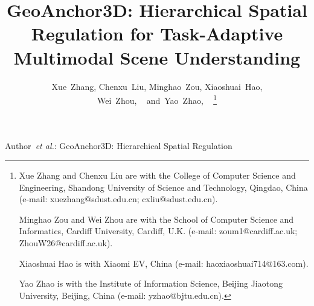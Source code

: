 \documentclass[lettersize,journal]{IEEEtran}
\begin{document}
\setlength{\floatsep}{3pt plus 1pt minus 1pt}
\setlength{\textfloatsep}{3pt plus 1pt minus 1pt}
\setlength{\intextsep}{3pt plus 1pt minus 1pt}
\setlength{\dblfloatsep}{3pt plus 1pt minus 1pt}
\setlength{\dbltextfloatsep}{3pt plus 1pt minus 1pt}
\setlength{\abovecaptionskip}{1pt}
\setlength{\belowcaptionskip}{1pt}
\setlength{\abovedisplayskip}{2pt plus 1pt minus 1pt}
\setlength{\belowdisplayskip}{2pt plus 1pt minus 1pt}
\setlength{\abovedisplayshortskip}{0pt plus 1pt}
\setlength{\belowdisplayshortskip}{1pt plus 1pt minus 1pt}
\setlength{\parskip}{0pt}

\title{GeoAnchor3D: Hierarchical Spatial Regulation for Task-Adaptive Multimodal Scene Understanding}

\author{Xue~Zhang, Chenxu~Liu, Minghao~Zou, Xiaoshuai~Hao,

        Wei~Zhou, ~ 
        and~Yao~Zhao, ~%
\thanks{Xue Zhang and Chenxu Liu are with the College of Computer Science and Engineering,
Shandong University of Science and Technology, Qingdao, China
(e-mail: xuezhang@sdust.edu.cn; cxliu@sdust.edu.cn).

Minghao Zou and Wei Zhou are with the School of Computer Science and Informatics,
Cardiff University, Cardiff, U.K.
(e-mail: zoum1@cardiff.ac.uk; ZhouW26@cardiff.ac.uk).

Xiaoshuai Hao is with Xiaomi EV, China
(e-mail: haoxiaoshuai714@163.com).

Yao Zhao is with the Institute of Information Science,
Beijing Jiaotong University, Beijing, China
(e-mail: yzhao@bjtu.edu.cn).}%

 }

%
{Author~\MakeLowercase{\textit{et al.}}: GeoAnchor3D: Hierarchical Spatial Regulation}

\maketitle
\end{document}

